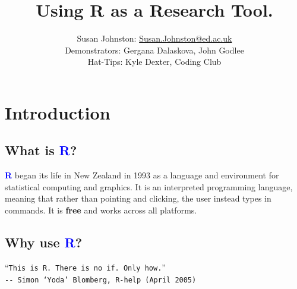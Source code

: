\documentclass[a4paper,12pt]{article}
\newcommand\boldblue[1]{\textcolor{blue}{\textbf{#1}}}
\newcommand{\code}[1]{\texttt{#1}}
\begin{document}





\title{Using R as a Research Tool.}
\author{Susan Johnston: \href{mailto:Susan.Johnston@ed.ac.uk}{Susan.Johnston@ed.ac.uk}  \\ 
        Demonstrators: Gergana Dalaskova, John Godlee \\
        Hat-Tips: Kyle Dexter, Coding Club}









\maketitle



\section {Introduction}

\subsection {What is \boldblue{R}?}

\boldblue{R} began its life in New Zealand in 1993 as a language and environment for statistical computing and graphics. It is an interpreted programming language, meaning that rather than pointing and clicking, the user instead types in commands. It is \textbf{free} and works across all platforms.


\subsection {Why use \boldblue{R}?}

\begin{center}
``\texttt{This is R. There is no if. Only how.}'' \\
\code{{-}{-} Simon `Yoda' Blomberg, R-help (April 2005)}

\end{center}
\end{document}
